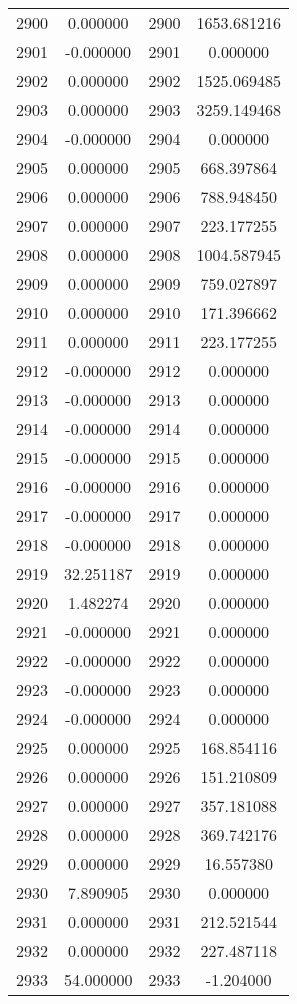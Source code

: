\documentclass[12pt]{article}
\begin{document}
\begin{longtable}{@{}cccc@{}}
2900 & 0.000000 & 2900 & 1653.681216 \\
2901 & -0.000000 & 2901 & 0.000000 \\
2902 & 0.000000 & 2902 & 1525.069485 \\
2903 & 0.000000 & 2903 & 3259.149468 \\
2904 & -0.000000 & 2904 & 0.000000 \\
2905 & 0.000000 & 2905 & 668.397864 \\
2906 & 0.000000 & 2906 & 788.948450 \\
2907 & 0.000000 & 2907 & 223.177255 \\
2908 & 0.000000 & 2908 & 1004.587945 \\
2909 & 0.000000 & 2909 & 759.027897 \\
2910 & 0.000000 & 2910 & 171.396662 \\
2911 & 0.000000 & 2911 & 223.177255 \\
2912 & -0.000000 & 2912 & 0.000000 \\
2913 & -0.000000 & 2913 & 0.000000 \\
2914 & -0.000000 & 2914 & 0.000000 \\
2915 & -0.000000 & 2915 & 0.000000 \\
2916 & -0.000000 & 2916 & 0.000000 \\
2917 & -0.000000 & 2917 & 0.000000 \\
2918 & -0.000000 & 2918 & 0.000000 \\
2919 & 32.251187 & 2919 & 0.000000 \\
2920 & 1.482274 & 2920 & 0.000000 \\
2921 & -0.000000 & 2921 & 0.000000 \\
2922 & -0.000000 & 2922 & 0.000000 \\
2923 & -0.000000 & 2923 & 0.000000 \\
2924 & -0.000000 & 2924 & 0.000000 \\
2925 & 0.000000 & 2925 & 168.854116 \\
2926 & 0.000000 & 2926 & 151.210809 \\
2927 & 0.000000 & 2927 & 357.181088 \\
2928 & 0.000000 & 2928 & 369.742176 \\
2929 & 0.000000 & 2929 & 16.557380 \\
2930 & 7.890905 & 2930 & 0.000000 \\
2931 & 0.000000 & 2931 & 212.521544 \\
2932 & 0.000000 & 2932 & 227.487118 \\
2933 & 54.000000 & 2933 & -1.204000 \\

\end{longtable}
\end{document}
